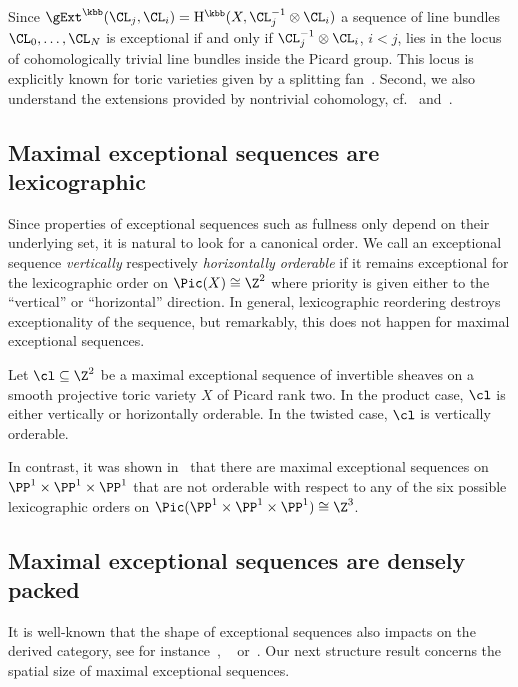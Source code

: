 Since $\gExt^\kbb(\CL_j,\CL_i)=
\mathrm{H}^\kbb(X,\CL_j^{-1}\otimes\CL_i)$
a sequence of line bundles $\CL_0,\ldots,\CL_N$ 
is exceptional if and only if $\CL_j^{-1}\otimes\CL_i$, 
$i<j$, lies in the locus of cohomologically trivial 
line bundles inside the Picard group. This locus is 
explicitly known for toric varieties given by a splitting 
fan~\cite{immaculate}. Second, we also understand 
the extensions provided by nontrivial cohomology, 
cf.~\cite{dop} and~\cite{displayingExt}.

\subsection{Maximal exceptional sequences are lexicographic}
\label{subsubsec:LexExSeq}
Since properties of exceptional sequences such 
as fullness only depend on their underlying set,
it is natural to look for a canonical order. 
{We call an exceptional sequence 
{\em vertically} respectively 
{\em horizontally orderable} if it remains 
exceptional for the lexicographic order on 
\mbox{$\Pic(X)\cong\Z^2$} where priority is given 
either to the ``vertical'' or ``horizontal'' 
direction. In general, lexicographic 
reordering destroys exceptionality of the 
sequence, but remarkably, this does not 
happen for maximal exceptional sequences.}

  \begin{main} \label{thm:introA}
 Let $\cl\subseteq\Z^2$ be a maximal 
exceptional sequence of invertible sheaves on 
a smooth projective toric variety $X$ of Picard 
rank two. In the product case, $\cl$ 
is either vertically or horizontally orderable. 
In the twisted case, $\cl$ is vertically orderable.
 \end{main}

In contrast, it was shown in~\cite[Example 3.5]{p1p1p1} 
that there are maximal exceptional sequences on
$\PP^1\times\PP^1\times\PP^1$ {that are not 
orderable with respect to any of the six possible 
lexicographic orders on 
$\Pic(\PP^1\times\PP^1\times\PP^1)\cong\Z^3$}.

\subsection{Maximal exceptional sequences are densely packed}
\label{subsubsec:PropExSeq}
It is well-known that the shape of exceptional 
sequences also impacts on the derived category, 
see for instance~\cite{resCatLMS},
~\cite{resCatCompositio} or~\cite{Mironov}. 
Our next structure result concerns the 
spatial size of maximal exceptional sequences. 

